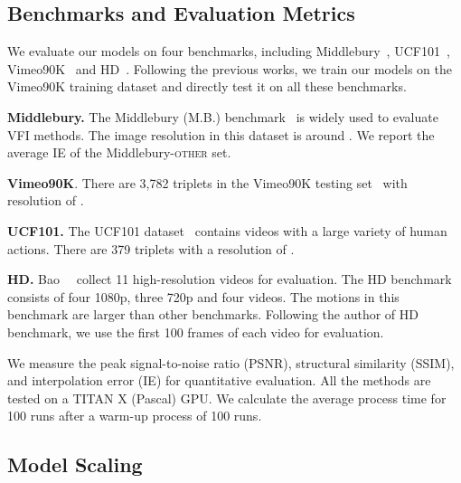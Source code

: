 \documentclass[10pt,twocolumn,letterpaper]{article}
\begin{document}
\subsection{Benchmarks and Evaluation Metrics}
We evaluate our models on 
four benchmarks, including Middlebury~\cite{baker2011database}, UCF101~\cite{soomro2012ucf101}, Vimeo90K~\cite{xue2019video} and HD~\cite{bao2019memc}. Following the previous works, we train our models on the Vimeo90K training dataset and directly test it on all these benchmarks. 

\textbf{Middlebury.} The Middlebury (M.B.) benchmark~\cite{baker2011database} is widely used to evaluate VFI methods. The image resolution in this dataset is around . We report the average IE of the Middlebury-\textsc{other} set.

\textbf{Vimeo90K}.
There are 3,782 triplets in the Vimeo90K testing set~\cite{xue2019video} with resolution of .


\textbf{UCF101.}
The UCF101 dataset~\cite{soomro2012ucf101} contains videos with a large variety of human actions. There are 379 triplets with a resolution of .



\textbf{HD.}
Bao~\etal~\cite{bao2019memc} collect 11 high-resolution videos for evaluation. The HD benchmark consists of four 1080p, three 720p and four  videos. The motions in this benchmark are larger than other benchmarks. Following the author of HD benchmark, we use the first 100 frames of each video for evaluation.

We measure the peak signal-to-noise ratio (PSNR), structural similarity (SSIM), and interpolation error (IE) for quantitative evaluation. All the methods are tested on a TITAN X (Pascal) GPU. We calculate the average process time for 100 runs after a warm-up process of 100 runs. 



\subsection{Model Scaling}
\label{sec:model_scaling}
\end{document}
